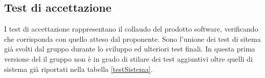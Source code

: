 \subsection{Test di accettazione}
I test di accettazione rappresentano il collaudo del prodotto software, verificando che corrisponda con quello atteso dal proponente. Sono l'unione dei test di sitema già svolti dal gruppo durante lo sviluppo ed ulteriori test finali.
In questa prima versione del \PdQv il gruppo non è in grado di stilare dei test aggiuntivi oltre quelli di sistema già riportati nella tabella \ref{testSistema}.